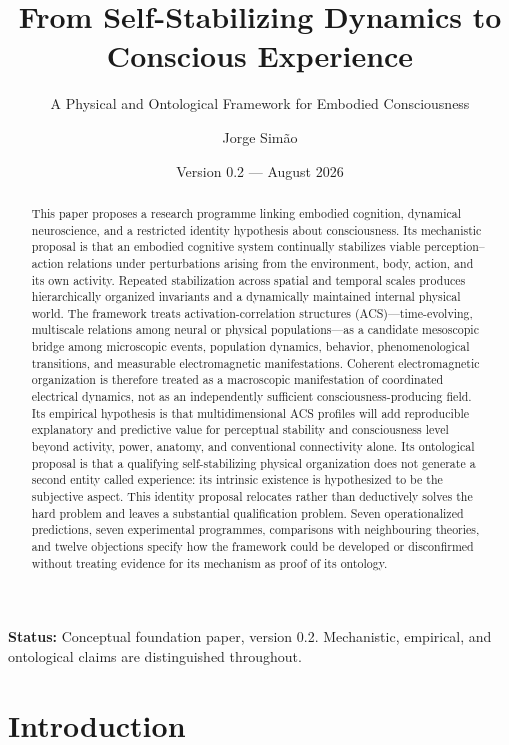 \documentclass[
  11pt,
  a4paper,
]{article}
\title{From Self-Stabilizing Dynamics to Conscious Experience}
\subtitle{A Physical and Ontological Framework for Embodied
Consciousness}
\author{Jorge Simão}
\date{Version 0.2 --- August 2026}
\begin{document}
\maketitle
\begin{center}\small\textbf{Status:} Conceptual foundation paper, version 0.2. Mechanistic, empirical, and ontological claims are distinguished throughout.\end{center}

\begin{abstract}
This paper proposes a research programme linking embodied cognition,
dynamical neuroscience, and a restricted identity hypothesis about
consciousness. Its mechanistic proposal is that an embodied cognitive
system continually stabilizes viable perception--action relations under
perturbations arising from the environment, body, action, and its own
activity. Repeated stabilization across spatial and temporal scales
produces hierarchically organized invariants and a dynamically
maintained internal physical world. The framework treats
activation-correlation structures (ACS)---time-evolving, multiscale
relations among neural or physical populations---as a candidate
mesoscopic bridge among microscopic events, population dynamics,
behavior, phenomenological transitions, and measurable electromagnetic
manifestations. Coherent electromagnetic organization is therefore
treated as a macroscopic manifestation of coordinated electrical
dynamics, not as an independently sufficient consciousness-producing
field. Its empirical hypothesis is that multidimensional ACS profiles
will add reproducible explanatory and predictive value for perceptual
stability and consciousness level beyond activity, power, anatomy, and
conventional connectivity alone. Its ontological proposal is that a
qualifying self-stabilizing physical organization does not generate a
second entity called experience: its intrinsic existence is hypothesized
to be the subjective aspect. This identity proposal relocates rather
than deductively solves the hard problem and leaves a substantial
qualification problem. Seven operationalized predictions, seven
experimental programmes, comparisons with neighbouring theories, and
twelve objections specify how the framework could be developed or
disconfirmed without treating evidence for its mechanism as proof of its
ontology.
\end{abstract}

\section{Introduction}\label{introduction}
\end{document}
